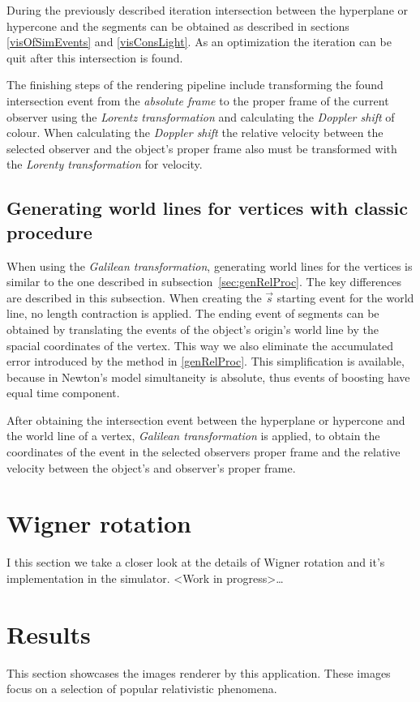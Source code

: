 \documentclass{egpubl}
\begin{document}
During the previously described iteration intersection between the hyperplane or hypercone and the segments can be obtained as described in sections \ref{visOfSimEvents} and \ref{visConsLight}. As an optimization the iteration can be quit after this intersection is found.

The finishing steps of the rendering pipeline include transforming the found intersection event from the \emph{absolute frame} to the proper frame of the current observer using the \emph{Lorentz transformation} and calculating the \emph{Doppler shift} of colour. When calculating the \emph{Doppler shift} the relative velocity between the selected observer and the object's proper frame also must be transformed with the \emph{Lorenty transformation} for velocity.

\subsection{Generating world lines for vertices with classic procedure}
When using the \emph{Galilean transformation}, generating world lines for the vertices is similar to the one described in subsection~\ref{sec:genRelProc}. The key differences are described in this subsection. When creating the $\vec{s}$ starting event for the world line, no length contraction is applied. The ending event of segments can be obtained by translating the events of the object's origin's world line by the spacial coordinates of the vertex. This way we also eliminate the accumulated error introduced by the method in \ref{genRelProc}. This simplification is available, because in Newton's model simultaneity is absolute, thus events of boosting have equal time component.

After obtaining the intersection event between the hyperplane or hypercone and the world line of a vertex, \emph{Galilean transformation} is applied, to obtain the coordinates of the event in the selected observers proper frame and the relative velocity between the object's and observer's proper frame.

\section{Wigner rotation}
\label{sec:wigner_rotation}
I this section we take a closer look at the details of Wigner rotation and it's implementation in the simulator. <Work in progress>\dots

\section{Results}
\label{sec:results}
This section showcases the images renderer by this application. These images focus on a selection of popular relativistic phenomena.
\end{document}
